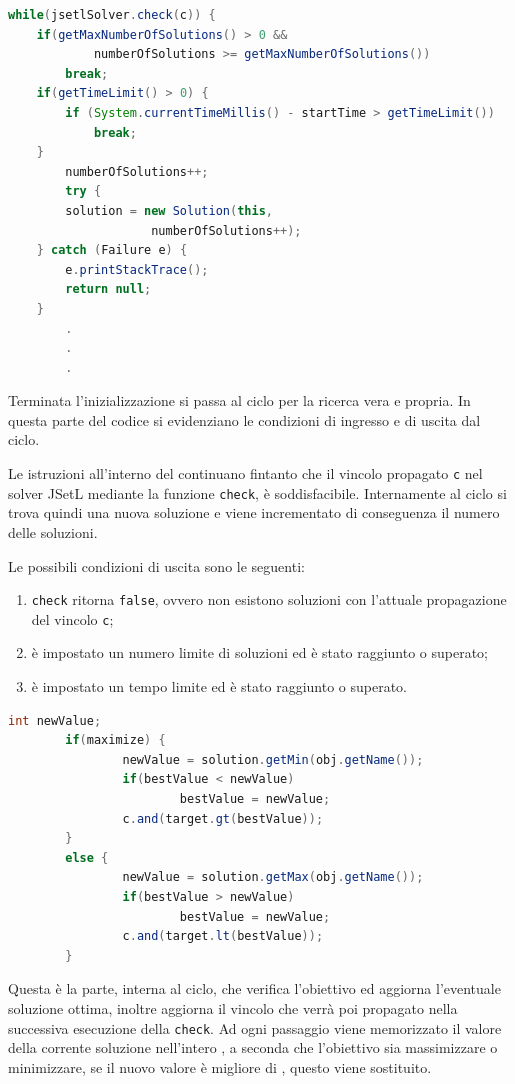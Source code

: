 \begin{lstlisting}[language = Java,
                   caption = {\files{findOptimalSolution}, il ciclo.}]
while(jsetlSolver.check(c)) {
	if(getMaxNumberOfSolutions() > 0 && 
			numberOfSolutions >= getMaxNumberOfSolutions())
		break;
	if(getTimeLimit() > 0) {
		if (System.currentTimeMillis() - startTime > getTimeLimit())
			break;				
	}
        numberOfSolutions++;
        try {
	    solution = new Solution(this, 
                    numberOfSolutions++);
	} catch (Failure e) {
		e.printStackTrace();
		return null;
	}
        .
        .
        .
\end{lstlisting}
Terminata l'inizializzazione si passa al ciclo per la ricerca vera e propria.
In questa parte del codice si evidenziano le condizioni di ingresso e di uscita 
dal ciclo.

Le istruzioni all'interno del  continuano fintanto che il vincolo
propagato \texttt{c} nel solver JSetL mediante la funzione \texttt{check}, 
è soddisfacibile. 
Internamente al ciclo si trova quindi una nuova soluzione e viene incrementato
di conseguenza il numero delle soluzioni.

Le possibili condizioni di uscita sono le seguenti:
\begin{enumerate}
\item \texttt{check} ritorna \texttt{false}, ovvero non esistono soluzioni
con l'attuale propagazione del vincolo \texttt{c};
\item è impostato un numero limite di soluzioni ed è stato raggiunto o superato;
\item è impostato un tempo limite ed è stato raggiunto o superato.
\end{enumerate}

\begin{lstlisting}[language = Java,
                   caption = {\files{findOptimalSolution}, verifica obiettivo.}
                  ]  
        int newValue;
        if(maximize) {
                newValue = solution.getMin(obj.getName());
                if(bestValue < newValue)
                        bestValue = newValue;
                c.and(target.gt(bestValue));
        }
        else {	
                newValue = solution.getMax(obj.getName());
                if(bestValue > newValue)
                        bestValue = newValue;
                c.and(target.lt(bestValue));
        }
\end{lstlisting}
Questa è la parte, interna al ciclo, che verifica l'obiettivo ed aggiorna 
l'eventuale soluzione ottima, inoltre aggiorna il vincolo che verrà poi
propagato nella successiva esecuzione della \texttt{check}. Ad ogni passaggio 
viene memorizzato il valore
della corrente soluzione nell'intero , a seconda che 
l'obiettivo sia massimizzare o minimizzare, se il nuovo valore
è migliore di , questo viene sostituito.

